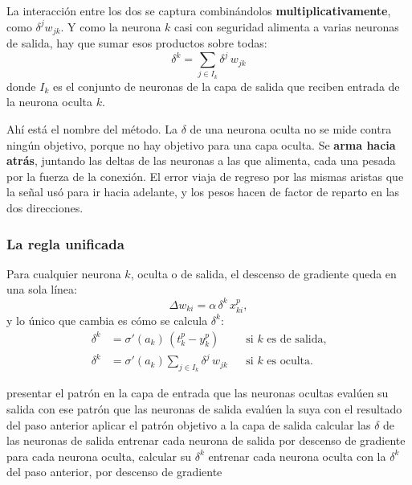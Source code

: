 \documentclass[11pt,letterpaper]{article}
\begin{document}
La interacción entre los dos se captura combinándolos
\textbf{multiplicativamente}, como $\delta^j w_{jk}$. Y como la
neurona $k$ casi con seguridad alimenta a varias neuronas de salida,
hay que sumar esos productos sobre todas:
\[
    \boxed{\;\delta^k = \sum_{j \in I_k} \delta^j\,w_{jk}\;}
\]
donde $I_k$ es el conjunto de neuronas de la capa de salida que
reciben entrada de la neurona oculta $k$.

\begin{idea}
  Ahí está el nombre del método. La $\delta$ de una neurona oculta no
  se mide contra ningún objetivo, porque no hay objetivo para una
  capa oculta. Se \textbf{arma hacia atrás}, juntando las deltas de
  las neuronas a las que alimenta, cada una pesada por la fuerza de
  la conexión. El error viaja de regreso por las mismas aristas que
  la señal usó para ir hacia adelante, y los pesos hacen de factor de
  reparto en las dos direcciones.
\end{idea}

\subsubsection*{La regla unificada}

Para cualquier neurona $k$, oculta o de salida, el descenso de
gradiente queda en una sola línea:
\[
    \Delta w_{ki} = \alpha\,\delta^k\,x_{ki}^p ,
\]
y lo único que cambia es cómo se calcula $\delta^k$:
\begin{align*}
  \delta^k &= \sigma'(a_k)\,(t_k^p - y_k^p)
    && \text{si } k \text{ es de salida,} \\
  \delta^k &= \sigma'(a_k) \sum_{j \in I_k} \delta^j\,w_{jk}
    && \text{si } k \text{ es oculta.}
\end{align*}

\begin{algorithm}[H]
\caption{Backpropagation}
\begin{algorithmic}[1]
\State presentar el patrón en la capa de entrada
\State que las neuronas ocultas evalúen su salida con ese patrón
\State que las neuronas de salida evalúen la suya con el resultado
       del paso anterior
\State aplicar el patrón objetivo a la capa de salida
\State calcular las $\delta$ de las neuronas de salida
\State entrenar cada neurona de salida por descenso de gradiente
\State para cada neurona oculta, calcular su $\delta^k$
\State entrenar cada neurona oculta con la $\delta^k$ del paso
       anterior, por descenso de gradiente
\end{algorithmic}
\end{algorithm}
\end{document}
